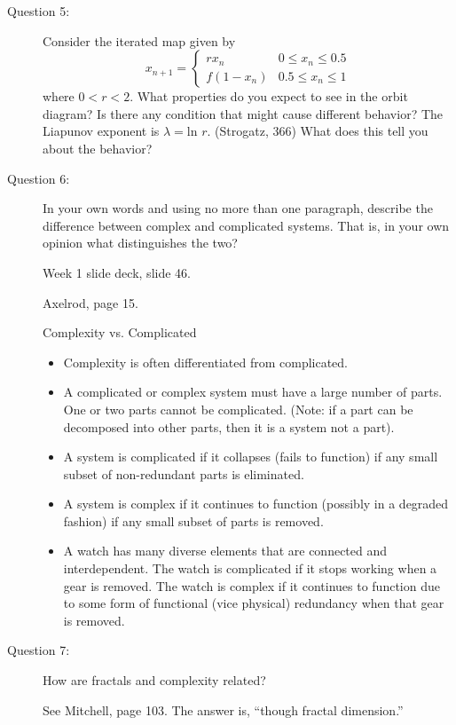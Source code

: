 \documentclass[letterpaper,10pt]{article}
\begin{document}
\begin{description}
\item[Question 5:]
Consider the iterated map given by
\[x_{n+1} = \left\{
  \begin{array}{lr}
    rx_n &  0\le x_n \le 0.5 \\
    f(1-x_n) &  0.5\le x_n \le 1
  \end{array}
\right.
\]
where $0<r<2$.  What properties do you expect to see in the orbit diagram?  Is there any condition that might cause different behavior?  The Liapunov exponent is $\lambda=\mbox{ln\ }r$. (Strogatz, 366)  What does this tell you about the behavior?


\item[Question 6:]
  In your own words and using no more than one paragraph, describe the difference between complex and complicated systems.  That is, in your own opinion what distinguishes the two?

Week 1 slide deck, slide 46.

Axelrod, page 15.

Complexity vs. Complicated
\begin{itemize}
  \item Complexity is often differentiated from complicated.
  \item A complicated or complex system must have a large number of parts.  One or two parts cannot be complicated.  (Note: if a part can be decomposed into other parts, then it is a system not a part).
  \item A system is complicated if it collapses (fails to function) if any small subset of non-redundant parts is eliminated.
  \item A system is complex if it continues to function (possibly in a degraded fashion) if any small subset of parts is removed.
  \item A watch has many diverse elements that are connected and interdependent.  The watch is complicated if it stops working when a gear is removed.  The watch is complex if it continues to function due to some form of functional (vice physical) redundancy when that gear is removed.
\end{itemize}


\item[Question 7:]
How are fractals and complexity related?

See Mitchell, page 103.  The answer is, ``though fractal dimension.''


\end{description}
\end{document}
